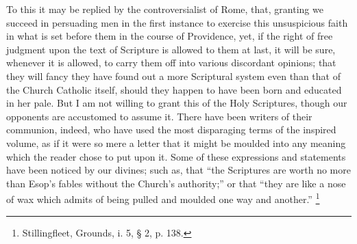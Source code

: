 To this it may be replied by the controversialist of Rome, that,
granting we succeed in persuading men in the first instance to
exercise this unsuspicious faith in what is set before them in the
course of Providence, yet, if the right of free judgment upon the text
of Scripture is allowed to them at last, it will be sure, whenever it
is allowed, to carry them off into various discordant opinions; that
they will fancy they have found out a more Scriptural system even than
that of the Church Catholic itself, should they happen to have been
born and educated in her pale. But I am not willing to grant this of
the Holy Scriptures, though our opponents are accustomed to assume it.
There have been writers of their communion, indeed, who have used the
most disparaging terms of the inspired volume, as if it were so mere a
letter that it might be moulded into any meaning which the reader
chose to put upon it. Some of these expressions and statements have
been noticed by our divines; such as, that ``the Scriptures are
worth no more than Esop's fables without the Church's authority;''
or that ``they are like a nose of wax which admits of being pulled
and moulded one way and another.'' \footnote{Stillingfleet, Grounds, i. 5, § 2, p. 138.}

